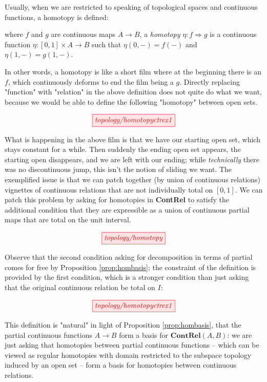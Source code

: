 \begin{fullwidth}

Usually, when we are restricted to speaking of topological spaces and continuous functions, a homotopy is defined:

\begin{defn}
where $f$ and $g$ are continuous maps $A \rightarrow B$, a \emph{homotopy} $\eta : f \Rightarrow g$ is a continuous function $\eta : [0,1] \times A \rightarrow B$ such that $\eta(0,-) = f(-)$ and $\eta(1,-) = g(1,-)$.
\end{defn}

In other words, a homotopy is like a short film where at the beginning there is an $f$, which continuously deforms to end the film being a $g$. Directly replacing "function" with "relation" in the above definition does not quite do what we want, because we would be able to define the following "homotopy" between open sets.

\[\tikzfig{topology/homotopyctrex1}\]

What is happening in the above film is that we have our starting open set, which stays constant for a while. Then suddenly the ending open set appears, the starting open disappears, and we are left with our ending; while \emph{technically} there was no discontinuous jump, this isn't the notion of sliding we want. The exemplified issue is that we can patch together (by union of continuous relations) vignettes of continuous relations that are not individually total on $[0,1]$. We can patch this problem by asking for homotopies in \textbf{ContRel} to satisfy the additional condition that they are expressible as a union of continuous partial maps that are total on the unit interval.

\[\tikzfig{topology/homotopy}\]

Observe that the second condition asking for decomposition in terms of partial comes for free by Proposition \ref{prop:hombasis}; the constraint of the definition is provided by the first condition, which is a stronger condition than just asking that the original continuous relation be total on $I$:

\[\tikzfig{topology/homotopyctrex1}\]

This definition is "natural" in light of Proposition \ref{prop:hombasis}, that the partial continuous functions $A \rightarrow B$ form a basis for $\mathbf{ContRel}(A,B)$: we are just asking that homotopies between partial continuous functions -- which can be viewed as regular homotopies with domain restricted to the subspace topology induced by an open set -- form a basis for homotopies between continuous relations.


\end{fullwidth}
